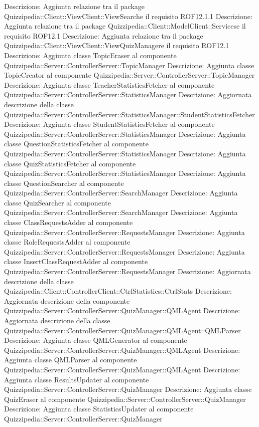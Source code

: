 Descrizione: Aggiunta relazione tra il package Quizzipedia::Client::ViewClient::ViewSearche il requisito ROF12.1.1 
Descrizione: Aggiunta relazione tra il package Quizzipedia::Client::ModelClient::Servicese il requisito ROF12.1 
Descrizione: Aggiunta relazione tra il package Quizzipedia::Client::ViewClient::ViewQuizManagere il requisito ROF12.1 
Descrizione: Aggiunta classe TopicEraser al componente Quizzipedia::Server::ControllerServer::TopicManager 
Descrizione: Aggiunta classe TopicCreator al componente Quizzipedia::Server::ControllerServer::TopicManager 
Descrizione: Aggiunta classe TeacherStatisticsFetcher al componente Quizzipedia::Server::ControllerServer::StatisticsManager 
Descrizione: Aggiornata descrizione della classe Quizzipedia::Server::ControllerServer::StatisticsManager::StudentStatisticsFetcher 
Descrizione: Aggiunta classe StudentStatisticsFetcher al componente Quizzipedia::Server::ControllerServer::StatisticsManager 
Descrizione: Aggiunta classe QuestionStatisticsFetcher al componente Quizzipedia::Server::ControllerServer::StatisticsManager 
Descrizione: Aggiunta classe QuizStatisticsFetcher al componente Quizzipedia::Server::ControllerServer::StatisticsManager 
Descrizione: Aggiunta classe QuestionSearcher al componente Quizzipedia::Server::ControllerServer::SearchManager 
Descrizione: Aggiunta classe QuizSearcher al componente Quizzipedia::Server::ControllerServer::SearchManager 
Descrizione: Aggiunta classe ClassRequestsAdder al componente Quizzipedia::Server::ControllerServer::RequestsManager 
Descrizione: Aggiunta classe RoleRequestsAdder al componente Quizzipedia::Server::ControllerServer::RequestsManager 
Descrizione: Aggiunta classe InsertClassRequestAdder al componente Quizzipedia::Server::ControllerServer::RequestsManager 
Descrizione: Aggiornata descrizione della classe Quizzipedia::Client::ControllerClient::CtrlStatistics::CtrlStats 
Descrizione: Aggiornata descrizione della componente Quizzipedia::Server::ControllerServer::QuizManager::QMLAgent 
Descrizione: Aggiornata descrizione della classe Quizzipedia::Server::ControllerServer::QuizManager::QMLAgent::QMLParser 
Descrizione: Aggiunta classe QMLGenerator al componente Quizzipedia::Server::ControllerServer::QuizManager::QMLAgent 
Descrizione: Aggiunta classe QMLParser al componente Quizzipedia::Server::ControllerServer::QuizManager::QMLAgent 
Descrizione: Aggiunta classe ResultsUpdater al componente Quizzipedia::Server::ControllerServer::QuizManager 
Descrizione: Aggiunta classe QuizEraser al componente Quizzipedia::Server::ControllerServer::QuizManager 
Descrizione: Aggiunta classe StatisticsUpdater al componente Quizzipedia::Server::ControllerServer::QuizManager 
